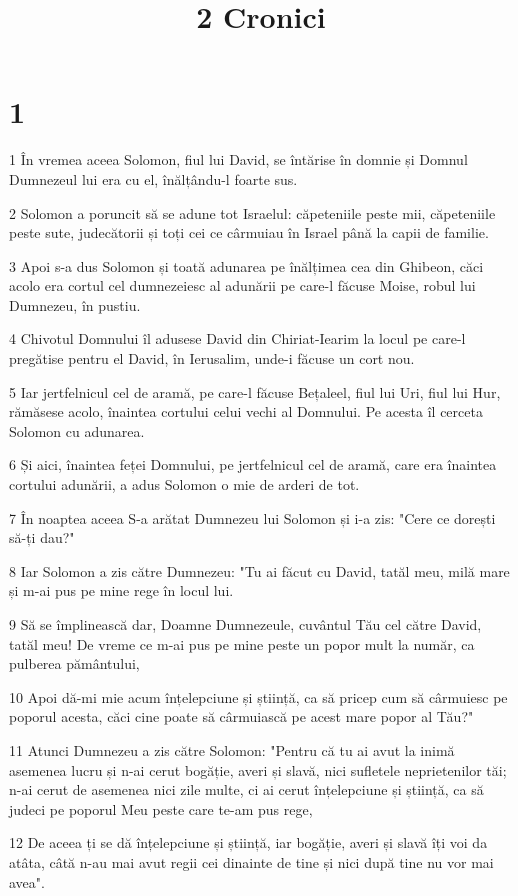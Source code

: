 

\title{2 Cronici}


\chapter{1}

\par 1 În vremea aceea Solomon, fiul lui David, se întărise în domnie și Domnul Dumnezeul lui era cu el, înălțându-l foarte sus.
\par 2 Solomon a poruncit să se adune tot Israelul: căpeteniile peste mii, căpeteniile peste sute, judecătorii și toți cei ce cârmuiau în Israel până la capii de familie.
\par 3 Apoi s-a dus Solomon și toată adunarea pe înălțimea cea din Ghibeon, căci acolo era cortul cel dumnezeiesc al adunării pe care-l făcuse Moise, robul lui Dumnezeu, în pustiu.
\par 4 Chivotul Domnului îl adusese David din Chiriat-Iearim la locul pe care-l pregătise pentru el David, în Ierusalim, unde-i făcuse un cort nou.
\par 5 Iar jertfelnicul cel de aramă, pe care-l făcuse Bețaleel, fiul lui Uri, fiul lui Hur, rămăsese acolo, înaintea cortului celui vechi al Domnului. Pe acesta îl cerceta Solomon cu adunarea.
\par 6 Și aici, înaintea feței Domnului, pe jertfelnicul cel de aramă, care era înaintea cortului adunării, a adus Solomon o mie de arderi de tot.
\par 7 În noaptea aceea S-a arătat Dumnezeu lui Solomon și i-a zis: "Cere ce dorești să-ți dau?"
\par 8 Iar Solomon a zis către Dumnezeu: "Tu ai făcut cu David, tatăl meu, milă mare și m-ai pus pe mine rege în locul lui.
\par 9 Să se împlinească dar, Doamne Dumnezeule, cuvântul Tău cel către David, tatăl meu! De vreme ce m-ai pus pe mine peste un popor mult la număr, ca pulberea pământului,
\par 10 Apoi dă-mi mie acum înțelepciune și știință, ca să pricep cum să cârmuiesc pe poporul acesta, căci cine poate să cârmuiască pe acest mare popor al Tău?"
\par 11 Atunci Dumnezeu a zis către Solomon: "Pentru că tu ai avut la inimă asemenea lucru și n-ai cerut bogăție, averi și slavă, nici sufletele neprietenilor tăi; n-ai cerut de asemenea nici zile multe, ci ai cerut înțelepciune și știință, ca să judeci pe poporul Meu peste care te-am pus rege,
\par 12 De aceea ți se dă înțelepciune și știință, iar bogăție, averi și slavă îți voi da atâta, câtă n-au mai avut regii cei dinainte de tine și nici după tine nu vor mai avea".
